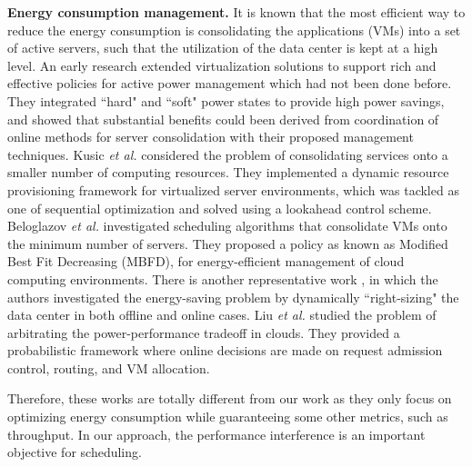 \documentclass[10pt,journal]{IEEEtran}
\begin{document}
\textbf{Energy consumption management.} 
It is known that the most efficient way to reduce the energy consumption is consolidating the applications (VMs) into a set of active servers, such that the utilization of the data center is kept at a high level. An early research \cite{Nathuji07} extended virtualization solutions to support rich and effective policies for active power management which had not been done before. They integrated ``hard" and ``soft" power states to provide high power savings, and showed that substantial benefits could been derived from coordination of online methods for server consolidation with their proposed management techniques. Kusic \emph{et al.} \cite{Kusic09} considered the problem of consolidating services onto a smaller number of computing resources. They implemented a dynamic resource provisioning framework for virtualized server environments, which was tackled as one of sequential optimization and solved using a lookahead control scheme. Beloglazov \emph{et al.} \cite{Beloglazov12} investigated scheduling algorithms that consolidate VMs onto the minimum number of servers. They proposed a policy as known as Modified Best Fit Decreasing (MBFD), for energy-efficient management of cloud computing environments. There is another representative work \cite{Lin11}, in which the authors investigated the energy-saving problem by dynamically ``right-sizing" the data center in both offline and online cases. Liu \emph{et al.} \cite{Liu13} studied the problem of arbitrating the power-performance tradeoff in clouds. They provided a probabilistic framework where online decisions are made on request admission control, routing, and VM allocation.

Therefore, these works are totally different from our work as they only focus on optimizing energy consumption while guaranteeing some other metrics, such as throughput. In our approach, the performance interference is an important objective for scheduling.
\end{document}
